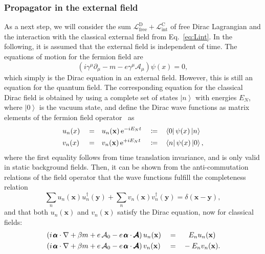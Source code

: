 \subsubsection*{Propagator in the external field}
As a next step, we will consider the sum $\mathcal{L}_{\text{free}}^{\text{D}} + \mathcal{L}_{\text{int}}^{\text{C}}$ of free Dirac Lagrangian  and the interaction with the classical external field  from Eq.~\eqref{eq:Lint}. In the following, it is assumed that the external field is independent of time. The equations of motion for the fermion field are
\begin{equation}
\left( i \gamma^\mu \partial_\mu - m - e \gamma^\mu \mathcal{A}_\mu \right)
\psi(x) = 0,
\end{equation}
which simply is the Dirac equation in an external field. However, this is still an equation for the quantum field. The corresponding equation for the classical Dirac field is obtained by using a complete set of states $\left|n\right>$ with energies $E_N$, where $\left|0\right>$ is the vacuum state, and define the Dirac wave functions as matrix elements of the fermion field operator~\mbox{\cite[Section 14.1]{weinberg2005}} as
\begin{alignat}{5}
&u_n(x)&&=&&u_n(\mathbf{x})\,\text{e}^{-iE_Nt}&&\coloneqq&&\left<0\right|\psi(x)\left|n\right>\notag\\
&v_n(x)&&=&&v_n(\mathbf{x})\,\text{e}^{+iE_Nt}&&\coloneqq&&\left<n\right|\psi(x)\left|0\right>,
\end{alignat}
where the first equality follows from time translation invariance, and is only valid in static background fields. 
Then, it can be shown from the anti-commutation relations of the field operator that the wave functions fulfill the completeness relation
\begin{equation}
\sum_n u_n(\mathbf{x})u_n^\dagger(\mathbf{y}) + \sum_n v_n(\mathbf{x})v_n^\dagger(\mathbf{y})=\delta(\mathbf{x}-\mathbf{y}),
\end{equation}
and that both $u_n(\mathbf{x})$ and $v_n(\mathbf{x})$ satisfy the Dirac equation, now for classical fields:
\begin{alignat}{3}
& \left( i\,\pmb{\alpha} \cdot \mathbf{\nabla} + \beta m + e\, \mathcal{A}_0 - e\, \pmb{\alpha}\cdot \pmb{\mathcal{A}} \right) u_n(\mathbf{x}) &&=&& \phantom{-}E_n u_n(\mathbf{x}) \notag\\
& \left( i\,\pmb{\alpha} \cdot \mathbf{\nabla} + \beta m + e\, \mathcal{A}_0 - e\, \pmb{\alpha}\cdot \pmb{\mathcal{A}} \right) v_n(\mathbf{x}) &&=&& -E_n v_n(\mathbf{x}).
\end{alignat}

